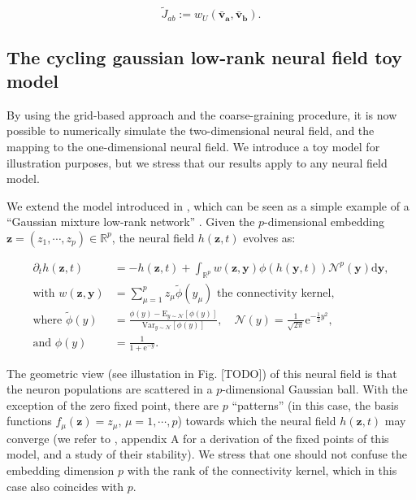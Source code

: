 \documentclass[10pt,letterpaper]{article}
\def\R{\mathbb R}
\def\Rp{\R^p}
\renewcommand{\vec}[1]{\boldsymbol{#1}}
\begin{document}
\begin{equation} \label{eq:def-tilde-J}
\tilde J_{ab} := w_U(\vec{\bar v_a}, \vec{\bar v_b}).
\end{equation}

\subsection{The cycling gaussian low-rank neural field toy model}

By using the grid-based approach and the coarse-graining procedure, it is now possible to numerically simulate the two-dimensional neural field, and the mapping to the one-dimensional neural field. We introduce a toy model for illustration purposes, but we stress that our results apply to any neural field model.

We extend the model introduced in \cite{schmutz2023convergence}, which can be seen as a simple example of a ``Gaussian mixture low-rank network'' \cite{Beiran2021}. Given the $p$-dimensional embedding $\vec z = (z_1, \cdots, z_p) \in \Rp$, the neural field $h(\vec z, t)$ evolves as:

\begin{equation*} \begin{aligned}
\partial_t h(\vec z, t) &= -h(\vec z, t) + \int_{\Rp} w(\vec z, \vec y) \phi(h(\vec y, t)) \mathcal N^p(\vec y) \mathrm d \vec y, \\
\text{with } w(\vec z, \vec y) &= \sum_{\mu=1}^p z_\mu \tilde\phi(y_\mu) \text{ the connectivity kernel}, \\
\text{where } \tilde\phi(y) &= \frac{\phi(y) - \mathrm E_{y\sim\mathcal N}[\phi(y)]}{\mathrm{Var}_{y\sim\mathcal N}[\phi(y)]}, \quad \mathcal N(y) = \frac{1}{\sqrt{2\pi}} \mathrm{e}^{-\tfrac 12 y^2}, \\
\text{and } \phi(y) &= \frac{1}{1+\mathrm{e}^{-y}}.
\end{aligned} \end{equation*}

The geometric view (see illustation in Fig. [TODO]) of this neural field is that the neuron populations are scattered in a $p$-dimensional Gaussian ball. With the exception of the zero fixed point, there are $p$ ``patterns'' (in this case, the basis functions $f_\mu(\vec z) = z_\mu,\,\mu=1,\cdots,p$) towards which the neural field $h(\vec z,t)$ may converge (we refer to \cite{nvadot2023mathesis}, appendix A for a derivation of the fixed points of this model, and a study of their stability). We stress that one should not confuse the embedding dimension $p$ with the rank of the connectivity kernel, which in this case also coincides with $p$.
\end{document}
